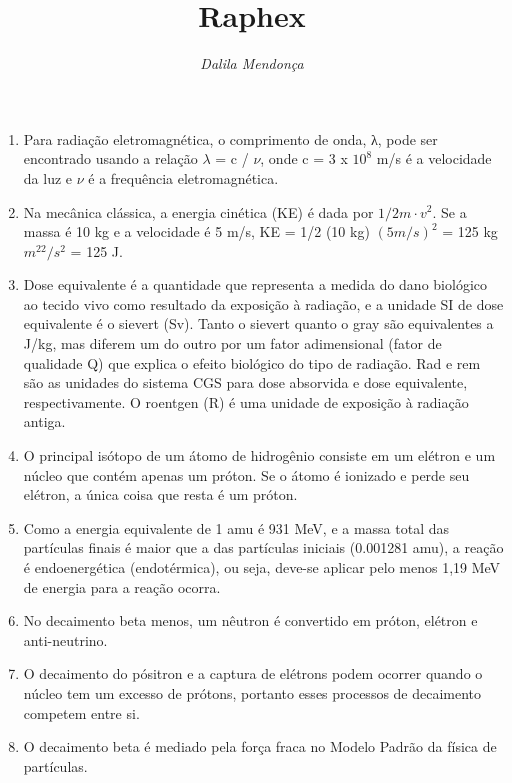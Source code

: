 \documentclass[11pt,a4paper]{article}
\title{\LobsterTwo\Huge{Raphex}}
\author{\LobsterTwo{2023}\nocite{*}}
\date{\LobsterTwo\textit{Dalila Mendonça}}
\begin{document}
	\maketitle

    
    \begin{enumerate}
        \item  Para radiação eletromagnética, o comprimento de onda, λ, pode ser encontrado usando a relação $\lambda$ = c / $\nu$, onde c = 3 x $10^8$ m/s é a velocidade da luz e $\nu$ é a frequência eletromagnética.
        
        \item Na mecânica clássica, a energia cinética (KE) é dada por $1/2m\cdot v^2$. Se a massa é 10 kg e a velocidade é 5 m/s, KE = 1/2 (10 kg) $(5 m/s)^2$ = 125 kg $m^22/s^2$ = 125 J.
        
        \item Dose equivalente é a quantidade que representa a medida do dano biológico ao tecido vivo como resultado da exposição à radiação, e a unidade SI de dose equivalente é o sievert (Sv). Tanto o sievert quanto o gray são equivalentes a J/kg, mas diferem um do outro por um fator adimensional (fator de qualidade Q) que explica o efeito biológico do tipo de radiação. Rad e rem são as unidades do sistema CGS para dose absorvida e dose equivalente, respectivamente. O roentgen (R) é uma unidade de exposição à radiação antiga.
        
        \item O principal isótopo de um átomo de hidrogênio consiste em um elétron e um núcleo que contém apenas um próton. Se o átomo é ionizado e perde seu elétron, a única coisa que resta é um próton.
        
        \item Como a energia equivalente de 1 amu é 931 MeV, e a massa total das partículas finais é maior que a das partículas iniciais (0.001281 amu), a reação é endoenergética (endotérmica), ou seja, deve-se aplicar pelo menos 1,19 MeV de energia para a reação ocorra.
        
        \item No decaimento beta menos, um nêutron é convertido em próton, elétron e anti-neutrino.
        
        \item O decaimento do pósitron e a captura de elétrons podem ocorrer quando o núcleo tem um excesso de prótons, portanto esses processos de decaimento competem entre si.
        
        \item O decaimento beta é mediado pela força fraca no Modelo Padrão da física de partículas.
        

\end{enumerate}
\end{document}
